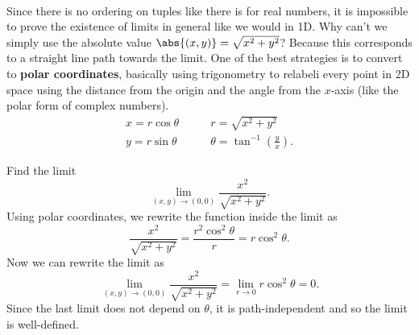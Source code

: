 \documentclass[../multivariate_calculus.tex]{subfiles}
\begin{document}
        \paragraph{}
        Since there is no ordering on tuples like there is for real numbers, it is impossible to prove the existence of limits in general like we would in 1D.
        Why can't we simply use the absolute value $\abs{(x,y)}=\sqrt{x^2+y^2}$? Because this corresponds to a straight line path towards the limit.
        One of the best strategies is to convert to \textbf{polar coordinates}, basically using trigonometry to relabeli every point in 2D space using the distance from the origin and the angle from the $x$-axis (like the polar form of complex numbers).
        \begin{align}
            x=r\cos\theta\quad&\quad r=\sqrt{x^2+y^2}\\
            y=r\sin\theta\quad&\quad\theta=\tan^{-1}\left(\frac{y}{x}\right).
        \end{align}
        \begin{example}
            Find the limit
            \begin{equation}
                \lim_{(x,y)\to(0,0)}\frac{x^2}{\sqrt{x^2+y^2}}.
            \end{equation}
            Using polar coordinates, we rewrite the function inside the limit as
            \begin{equation}
                \frac{x^2}{\sqrt{x^2+y^2}}=\frac{r^2\cos^2\theta}{r}=r\cos^2\theta.
            \end{equation}
            Now we can rewrite the limit as
            \begin{equation}
                \lim_{(x,y)\to(0,0)}\frac{x^2}{\sqrt{x^2+y^2}}=\lim_{r\to 0}r\cos^2\theta=0.
            \end{equation}
            Since the last limit does not depend on $\theta$, it is path-independent and so the limit is well-defined.
        \end{example}
\end{document}
